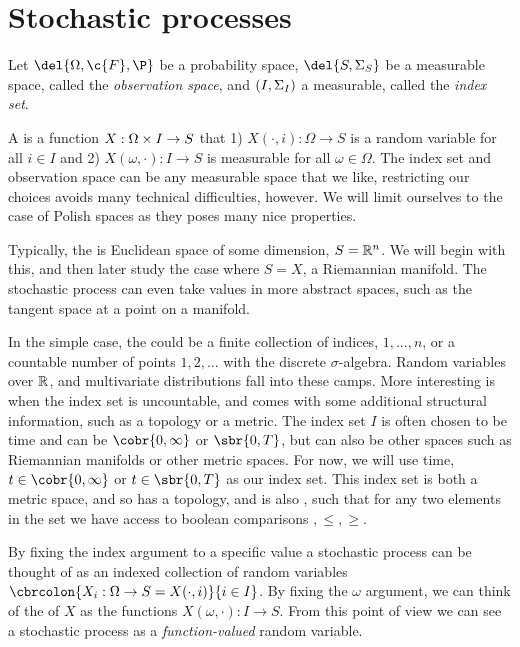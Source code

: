 \section{Stochastic processes}

Let \(\del{\Omega, \c{F}, \P}\) be a probability space, \(\del{S, \sigalg{S}}\) be a measurable space, called the \emph{observation space}, and \((I, \Sigma_{I})\) a measurable, called the \emph{index set}.

A  is a function \(X: \Omega\times I \to S\) that 1) \(X(\cdot, i): \Omega \to S\) is a random variable for all \(i\in I\) and 2) \(X(\omega, \cdot): I\to S\) is measurable for all \(\omega\in \Omega\).
The index set and observation space can be any measurable space that we like, restricting our choices avoids many technical difficulties, however.
We will limit ourselves to the case of Polish spaces as they poses many nice properties.

Typically, the  is Euclidean space of some dimension, \(S=\mathbb{R}^n\).
We will begin with this, and then later study the case where \(S=X\), a Riemannian manifold.
The stochastic process can even take values in more abstract spaces, such as the tangent space at a point on a manifold.

In the simple case, the  could be a finite collection of indices, \(1, .
.., n\), or a countable number of points \(1, 2, ...\) with the discrete \(\sigma\)-algebra.
Random variables over \(\mathbb{R}\), and multivariate distributions fall into these camps.
More interesting is when the index set is uncountable, and comes with some additional structural information, such as a topology or a metric.
The index set \(I\) is often chosen to be time and can be \(\cobr{0, \infty}\) or \(\sbr{0,T}\), but can also be other spaces such as Riemannian manifolds or other metric spaces.
For now, we will use time, \(t \in \cobr{0, \infty}\) or \(t \in \sbr{0,T}\) as our index set.
This index set is both a metric space, and so has a topology, and is also , such that for any two elements in the set we have access to boolean comparisons \(<,>,\leq,\geq\).

By fixing the index argument to a specific value a stochastic process can be thought of as an indexed collection of random variables \(\cbrcolon{X_i: \Omega \to S = X(\cdot, i)}{i\in I}\).
By fixing the \(\omega\) argument, we can think of the  of \(X\) as the functions \(X(\omega, \cdot): I \to S\).
From this point of view we can see a stochastic process as a \emph{function-valued} random variable.

